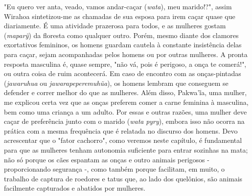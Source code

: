 "Eu quero ver anta, veado, vamos andar-caçar (\emph{wata}), meu
marido!?", assim Wirahoa sintetizou-me as chamadas de sua esposa para
irem caçar quase que diariamente. É uma atividade prazerosa para todos,
e as mulheres gostam (\emph{maparỹ}) da floresta como qualquer outro.
Porém, mesmo diante dos clamores exortativos femininos, os homens
guardam cautela à constante insistência delas para caçar, sejam
acompanhadas pelos homens ou por outras mulheres. A pronta resposta
masculina é, quase sempre, "não vá, pois é perigoso, a onça te comerá!",
ou outra coisa de ruim acontecerá. Em caso de encontro com as
onças-pintadas (\emph{jawaruhua} ou \emph{jawarapeperemuhũa}), os homens
lembram que conseguem se defender e correr melhor do que as mulheres.
Além disso, Pakwa'ĩa, uma mulher, me explicou certa vez que as onças
preferem comer a carne feminina à masculina, bem como uma criança a um
adulto. Por essas e outras razões, uma mulher deve caçar de preferência
junto com o marido (\emph{wata} \emph{pyry}), embora isso não ocorra na
prática com a mesma frequência que é relatada no discurso dos homens.
Devo acrescentar que o "fator cachorro", como veremos neste capítulo, é
fundamental para que as mulheres tenham autonomia suficiente para entrar
sozinhas na mata; não só porque os cães espantam as onças e outro
animais perigosos - proporcionando segurança -, como também porque
facilitam, em muito, o trabalho de captura de roedores e tatus que, ao
lado dos quelônios, são animais facilmente capturados e abatidos por
mulheres.

